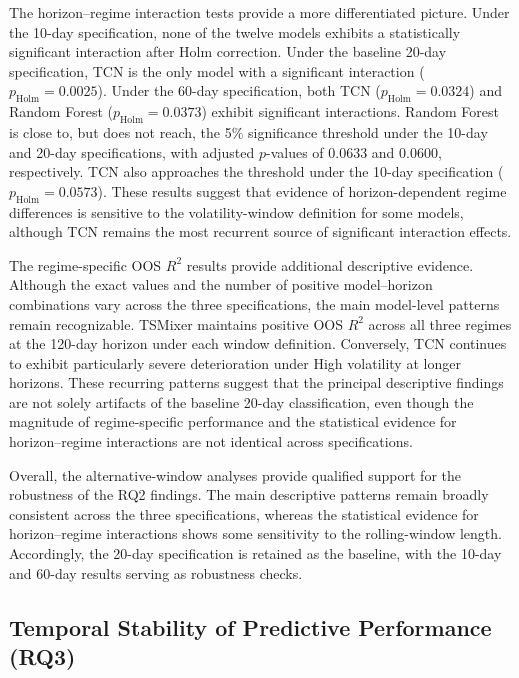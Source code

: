 \documentclass[runningheads,orivec]{llncs}
\makeatletter
\providecommand{\FloatBarrier}{\par\ifx\@deferlist\@empty\else\clearpage\fi}
\makeatother
\begin{document}
The horizon--regime interaction tests provide a more differentiated picture. Under the 10-day specification, none of the twelve models exhibits a statistically significant interaction after Holm correction. Under the baseline 20-day specification, TCN is the only model with a significant interaction ($p_{\mathrm{Holm}}=0.0025$). Under the 60-day specification, both TCN ($p_{\mathrm{Holm}}=0.0324$) and Random Forest ($p_{\mathrm{Holm}}=0.0373$) exhibit significant interactions. Random Forest is close to, but does not reach, the 5\% significance threshold under the 10-day and 20-day specifications, with adjusted $p$-values of 0.0633 and 0.0600, respectively. TCN also approaches the threshold under the 10-day specification ($p_{\mathrm{Holm}}=0.0573$). These results suggest that evidence of horizon-dependent regime differences is sensitive to the volatility-window definition for some models, although TCN remains the most recurrent source of significant interaction effects.

The regime-specific OOS $R^2$ results provide additional descriptive evidence. Although the exact values and the number of positive model--horizon combinations vary across the three specifications, the main model-level patterns remain recognizable. TSMixer maintains positive OOS $R^2$ across all three regimes at the 120-day horizon under each window definition. Conversely, TCN continues to exhibit particularly severe deterioration under High volatility at longer horizons. These recurring patterns suggest that the principal descriptive findings are not solely artifacts of the baseline 20-day classification, even though the magnitude of regime-specific performance and the statistical evidence for horizon--regime interactions are not identical across specifications.

Overall, the alternative-window analyses provide qualified support for the robustness of the RQ2 findings. The main descriptive patterns remain broadly consistent across the three specifications, whereas the statistical evidence for horizon--regime interactions shows some sensitivity to the rolling-window length. Accordingly, the 20-day specification is retained as the baseline, with the 10-day and 60-day results serving as robustness checks.

\FloatBarrier
\subsection{Temporal Stability of Predictive Performance (RQ3)}\label{subsec:temporal_stability}
\end{document}
